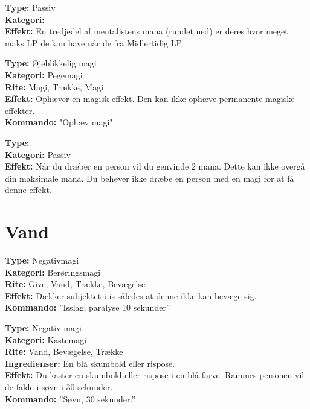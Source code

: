 \begin{primærMagi*}
\textbf{Type:} Passiv\\
\textbf{Kategori:} -\\
\textbf{Effekt:} En tredjedel af mentalistens mana (rundet ned) er deres hvor meget maks LP de kan have når de fra Midlertidig LP. \\
\end{primærMagi*}

\begin{primærMagi*}
\textbf{Type:} Øjeblikkelig magi\\
\textbf{Kategori:} Pegemagi\\
\textbf{Rite:} Magi, Trække, Magi\\
\textbf{Effekt:} Ophæver en magisk effekt. Den kan ikke ophæve permanente magiske effekter.\\ 
\textbf{Kommando:} "Ophæv magi"
\end{primærMagi*}

\begin{primærMagi*}
\textbf{Type:} -\\
\textbf{Kategori:} Passiv\\
\textbf{Effekt:} Når du dræber en person vil du genvinde 2 mana. Dette kan ikke overgå din maksimale mana. Du behøver ikke dræbe en person med en magi for at få denne effekt.
\end{primærMagi*}

\section{Vand}
\begin{vand*}[Isslag]
\textbf{Type:} Negativmagi\\
\textbf{Kategori:} Berøringsmagi\\
\textbf{Rite:} Give, Vand, Trække, Bevægelse\\
\textbf{Effekt:} Dækker subjektet i is således at denne ikke kan bevæge sig.\\
\textbf{Kommando:} ”Isslag, paralyse 10 sekunder”
\end{vand*}

\begin{vand*}
\textbf{Type:} Negativ magi\\
\textbf{Kategori:} Kastemagi\\
\textbf{Rite:} Vand, Bevægelse, Trække\\
\textbf{Ingredienser:} En blå skumbold eller rispose.\\
\textbf{Effekt:} Du kaster en skumbold eller rispose i en blå farve. Rammes personen vil de falde i søvn i 30 sekunder.\\
\textbf{Kommando:} ”Søvn, 30 sekunder.”
\end{vand*}

